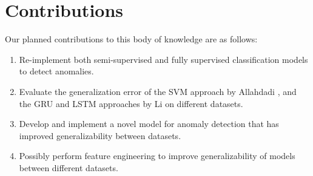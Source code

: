 \section{Contributions}



Our planned contributions to this body of knowledge are as follows:

\begin{enumerate}
    \item Re-implement both semi-supervised and fully supervised classification models to detect anomalies.
    \item Evaluate the generalization error of the SVM approach by Allahdadi \etal \cite{Allahdadi2017ADetection}, and the GRU and LSTM approaches by Li \etal \cite{li2019machine} on different datasets.
    \item Develop and implement a novel model for anomaly detection that has improved generalizability between datasets.
    \item Possibly perform feature engineering to improve generalizability of models between different datasets.
\end{enumerate}




